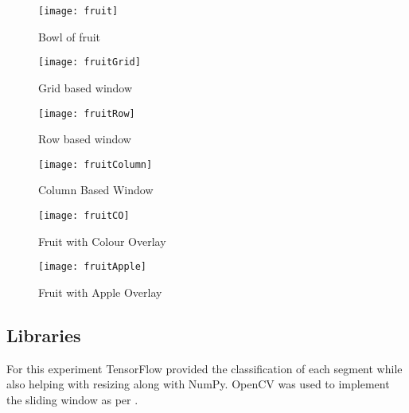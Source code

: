 \begin{figure}[h] 
  \label{fruitBowlManipulations} 
  \begin{minipage}[b]{0.5\linewidth}
    \centering
    \texttt{[image: fruit]}
    \caption{Bowl of fruit \parencite{fruitBowl}}
    \label{fig:fruit}
    \vspace{4ex}
  \end{minipage}%
  \begin{minipage}[b]{0.5\linewidth}
    \centering
    \texttt{[image: fruitGrid]}
	\caption{Grid based window}
    \label{fig:fruitGrid}
    \vspace{4ex}
  \end{minipage} 
  \begin{minipage}[b]{0.5\linewidth}
    \centering
    \texttt{[image: fruitRow]}
    \caption{Row based window}
    \label{fig:fruitRow}
    \vspace{4ex}
  \end{minipage}%
  \begin{minipage}[b]{0.5\linewidth}
    \centering
    \texttt{[image: fruitColumn]}
    \caption{Column Based Window}
    \label{fig:fruitColumn}
    \vspace{4ex}
  \end{minipage}
  \begin{minipage}[b]{0.5\linewidth}
    \centering
    \texttt{[image: fruitCO]}
    \caption{Fruit with Colour Overlay}
    \label{fig:fruitOverlay}
    \vspace{4ex}
  \end{minipage}%
  \begin{minipage}[b]{0.5\linewidth}
    \centering
    \texttt{[image: fruitApple]}
    \caption{Fruit with Apple Overlay}
    \label{fig:fruitApple}
    \vspace{4ex}
  \end{minipage}
\end{figure}
\afterpage{\clearpage}

\tocless\subsection{Libraries}
For this experiment TensorFlow provided the classification of each segment while
also helping with resizing along with NumPy. OpenCV was used to implement the
sliding window as per \parencite{slidingWindowTut}.

